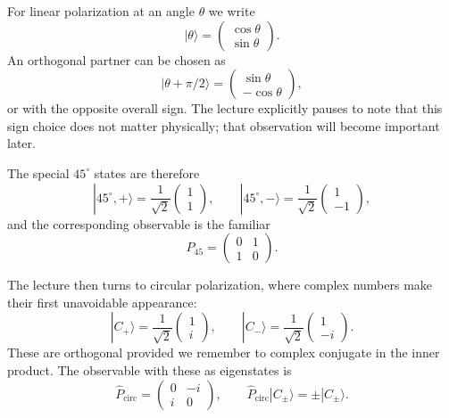 For linear polarization at an angle $\theta$ we write
\begin{equation}
|\theta\rangle=
\begin{pmatrix}
\cos\theta\\
\sin\theta
\end{pmatrix}.
\end{equation}
An orthogonal partner can be chosen as
\begin{equation}
|\theta+\pi/2\rangle=
\begin{pmatrix}
\sin\theta\\
-\cos\theta
\end{pmatrix},
\end{equation}
or with the opposite overall sign. The lecture explicitly pauses to note that this sign choice does not matter physically; that observation will become important later.

The special $45^\circ$ states are therefore
\begin{equation}
|45^\circ,+\rangle=\frac{1}{\sqrt2}
\begin{pmatrix}
1\\
1
\end{pmatrix},
\qquad
|45^\circ,-\rangle=\frac{1}{\sqrt2}
\begin{pmatrix}
1\\
-1
\end{pmatrix},
\end{equation}
and the corresponding observable is the familiar
\begin{equation}
\hat P_{45}=
\begin{pmatrix}
0&1\\
1&0
\end{pmatrix}.
\end{equation}

The lecture then turns to circular polarization, where complex numbers make their first unavoidable appearance:
\begin{equation}
|C_+\rangle=\frac{1}{\sqrt2}
\begin{pmatrix}
1\\
i
\end{pmatrix},
\qquad
|C_-\rangle=\frac{1}{\sqrt2}
\begin{pmatrix}
1\\
-i
\end{pmatrix}.
\end{equation}
These are orthogonal provided we remember to complex conjugate in the inner product. The observable with these as eigenstates is
\begin{equation}
\hat P_{\mathrm{circ}}=
\begin{pmatrix}
0&-i\\
i&0
\end{pmatrix},
\qquad
\hat P_{\mathrm{circ}}|C_\pm\rangle=\pm |C_\pm\rangle.
\end{equation}

